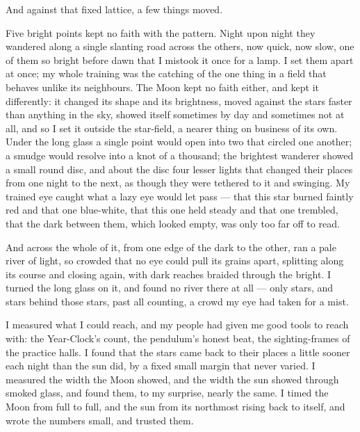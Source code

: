And against that fixed lattice, a few things moved.\par

Five bright points kept no faith with the pattern. Night upon night they wandered along a single slanting road across the others, now quick, now slow, one of them so bright before dawn that I mistook it once for a lamp. I set them apart at once; my whole training was the catching of the one thing in a field that behaves unlike its neighbours. The Moon kept no faith either, and kept it differently: it changed its shape and its brightness, moved against the stars faster than anything in the sky, showed itself sometimes by day and sometimes not at all, and so I set it outside the star-field, a nearer thing on business of its own. Under the long glass a single point would open into two that circled one another; a smudge would resolve into a knot of a thousand; the brightest wanderer showed a small round disc, and about the disc four lesser lights that changed their places from one night to the next, as though they were tethered to it and swinging. My trained eye caught what a lazy eye would let pass --- that this star burned faintly red and that one blue-white, that this one held steady and that one trembled, that the dark between them, which looked empty, was only too far off to read.\par

And across the whole of it, from one edge of the dark to the other, ran a pale river of light, so crowded that no eye could pull its grains apart, splitting along its course and closing again, with dark reaches braided through the bright. I turned the long glass on it, and found no river there at all --- only stars, and stars behind those stars, past all counting, a crowd my eye had taken for a mist.\par

I measured what I could reach, and my people had given me good tools to reach with: the Year-Clock's count, the pendulum's honest beat, the sighting-frames of the practice halls. I found that the stars came back to their places a little sooner each night than the sun did, by a fixed small margin that never varied. I measured the width the Moon showed, and the width the sun showed through smoked glass, and found them, to my surprise, nearly the same. I timed the Moon from full to full, and the sun from its northmost rising back to itself, and wrote the numbers small, and trusted them.\par


